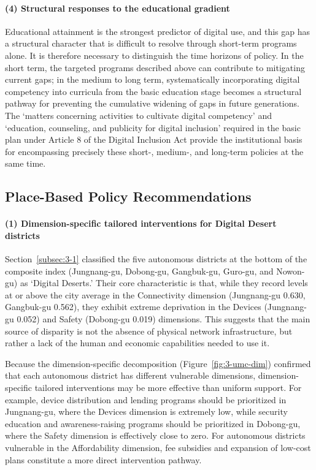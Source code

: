 \paragraph{(4) Structural responses to the educational gradient}

Educational attainment is the strongest predictor of digital use, and this gap has a structural character that is difficult to resolve through short-term programs alone. It is therefore necessary to distinguish the time horizons of policy. In the short term, the targeted programs described above can contribute to mitigating current gaps; in the medium to long term, systematically incorporating digital competency into curricula from the basic education stage becomes a structural pathway for preventing the cumulative widening of gaps in future generations. The `matters concerning activities to cultivate digital competency' and `education, counseling, and publicity for digital inclusion' required in the basic plan under Article 8 of the Digital Inclusion Act provide the institutional basis for encompassing precisely these short-, medium-, and long-term policies at the same time.

\subsection{Place-Based Policy Recommendations}
\label{subsec:4-3}

\paragraph{(1) Dimension-specific tailored interventions for Digital Desert districts}

Section~\ref{subsec:3-1} classified the five autonomous districts at the bottom of the composite index (Jungnang-gu, Dobong-gu, Gangbuk-gu, Guro-gu, and Nowon-gu) as `Digital Deserts.' Their core characteristic is that, while they record levels at or above the city average in the Connectivity dimension (Jungnang-gu 0.630, Gangbuk-gu 0.562), they exhibit extreme deprivation in the Devices (Jungnang-gu 0.052) and Safety (Dobong-gu 0.019) dimensions. This suggests that the main source of disparity is not the absence of physical network infrastructure, but rather a lack of the human and economic capabilities needed to use it.

Because the dimension-specific decomposition (Figure~\ref{fig:3-umc-dim}) confirmed that each autonomous district has different vulnerable dimensions, dimension-specific tailored interventions may be more effective than uniform support. For example, device distribution and lending programs should be prioritized in Jungnang-gu, where the Devices dimension is extremely low, while security education and awareness-raising programs should be prioritized in Dobong-gu, where the Safety dimension is effectively close to zero. For autonomous districts vulnerable in the Affordability dimension, fee subsidies and expansion of low-cost plans constitute a more direct intervention pathway.

